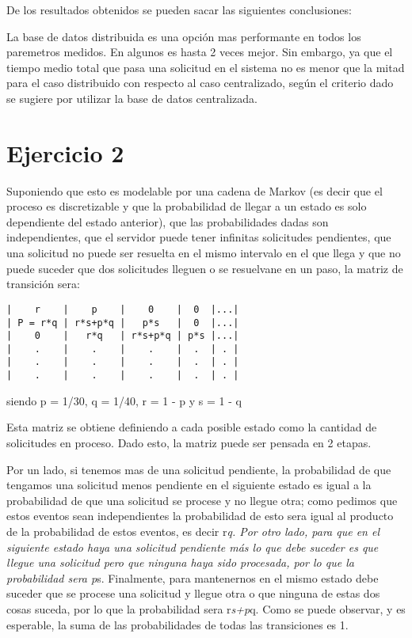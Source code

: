 \documentclass[11pt]{article}
\begin{document}
    De los resultados obtenidos se pueden sacar las siguientes conclusiones:

La base de datos distribuida es una opción mas performante en todos los
paremetros medidos. En algunos es hasta 2 veces mejor. Sin embargo, ya
que el tiempo medio total que pasa una solicitud en el sistema no es
menor que la mitad para el caso distribuido con respecto al caso
centralizado, según el criterio dado se sugiere por utilizar la base de
datos centralizada.

    \section{Ejercicio 2}\label{ejercicio-2}

Suponiendo que esto es modelable por una cadena de Markov (es decir que
el proceso es discretizable y que la probabilidad de llegar a un estado
es solo dependiente del estado anterior), que las probabilidades dadas
son independientes, que el servidor puede tener infinitas solicitudes
pendientes, que una solicitud no puede ser resuelta en el mismo
intervalo en el que llega y que no puede suceder que dos solicitudes
lleguen o se resuelvane en un paso, la matriz de transición sera:

\begin{verbatim}
|    r    |    p    |    0    |  0  |...|       
| P = r*q | r*s+p*q |   p*s   |  0  |...|
|    0    |   r*q   | r*s+p*q | p*s |...|
|    .    |    .    |    .    |  .  | . |
|    .    |    .    |    .    |  .  | . |
|    .    |    .    |    .    |  .  | . |
\end{verbatim}

siendo p = 1/30, q = 1/40, r = 1 - p y s = 1 - q

Esta matriz se obtiene definiendo a cada posible estado como la cantidad
de solicitudes en proceso. Dado esto, la matriz puede ser pensada en 2
etapas.

Por un lado, si tenemos mas de una solicitud pendiente, la probabilidad
de que tengamos una solicitud menos pendiente en el siguiente estado es
igual a la probabilidad de que una solicitud se procese y no llegue
otra; como pedimos que estos eventos sean independientes la probabilidad
de esto sera igual al producto de la probabilidad de estos eventos, es
decir r\emph{q. Por otro lado, para que en el siguiente estado haya una
solicitud pendiente más lo que debe suceder es que llegue una solicitud
pero que ninguna haya sido procesada, por lo que la probabilidad sera
p}s. Finalmente, para mantenernos en el mismo estado debe suceder que se
procese una solicitud y llegue otra o que ninguna de estas dos cosas
suceda, por lo que la probabilidad sera r\emph{s+p}q. Como se puede
observar, y es esperable, la suma de las probabilidades de todas las
transiciones es 1.
\end{document}
